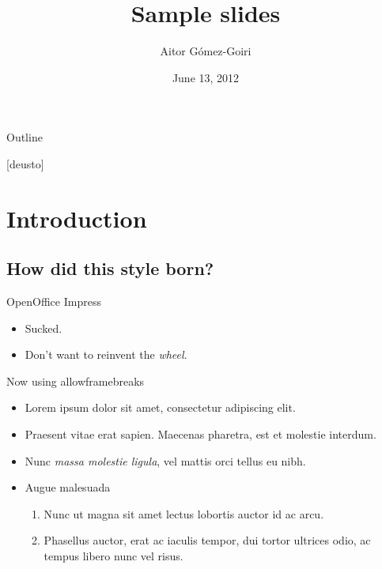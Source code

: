 \documentclass{beamer} %
\title{Sample slides}
\author{Aitor Gómez-Goiri}
\institute{DeustoTech - Deusto Institute of Technology, University of Deusto
\url{http://www.morelab.deusto.es}}
\date{June 13, 2012}
\begin{document}
  \owntitlepage

  \begin{frame}{Outline}
    \transwipe
  \end{frame}

[deusto]
\section{Introduction}

  \subsection{How did this style born?}
  
  \begin{frame}{OpenOffice Impress}
    \begin{itemize}
	\item Sucked.
	\pause
	\item Don't want to reinvent the \emph{wheel}.
    \end{itemize}
  \end{frame}
  

  \begin{frame}[allowframebreaks]{Now using allowframebreaks}
    \begin{itemize}
      \item Lorem ipsum dolor sit amet, consectetur adipiscing elit.
      \item Praesent vitae erat sapien. Maecenas pharetra, est et molestie interdum.
      \item Nunc \emph{massa molestie ligula}, vel mattis orci tellus eu nibh.
      \framebreak
      \item Augue malesuada
      \begin{enumerate}
	  \item Nunc ut magna sit amet lectus lobortis auctor id ac arcu.
	  \item Phasellus auctor, erat ac iaculis tempor, dui tortor ultrices odio, ac tempus libero nunc vel risus.
	\end{enumerate}
    \end{itemize}
  \end{frame}

\end{document}

